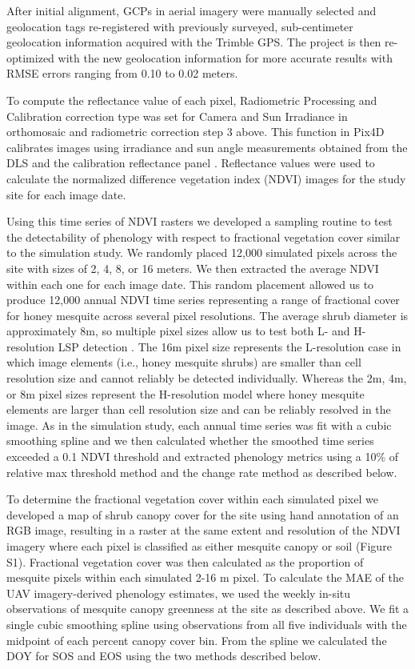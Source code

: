 \documentclass{article}
\begin{document}
After initial alignment, GCPs in aerial imagery were manually selected and geolocation tags re-registered with previously surveyed, sub-centimeter geolocation information acquired with the Trimble GPS. The project is then re-optimized with the new geolocation information for more accurate results with RMSE errors ranging from 0.10 to 0.02 meters.

To compute the reflectance value of each pixel, Radiometric Processing and Calibration correction type was set for Camera and Sun Irradiance in orthomosaic and radiometric correction step 3 above. This function in Pix4D calibrates images using irradiance and sun angle measurements obtained from the DLS and the calibration reflectance panel \cite{cao2019}. Reflectance values were used to calculate the normalized difference vegetation index (NDVI) images for the study site for each image date. 

Using this time series of NDVI rasters we developed a sampling routine to test the detectability of phenology with respect to fractional vegetation cover similar to the simulation study. We randomly placed 12,000 simulated pixels across the site with sizes of 2, 4, 8, or 16 meters. We then extracted the average NDVI within each one for each image date. This random placement allowed us to produce 12,000 annual NDVI time series representing a range of fractional cover for honey mesquite across several pixel resolutions. The average shrub diameter is approximately 8m, so multiple pixel sizes allow us to test both L- and H-resolution LSP detection \cite{strahler1986}. The 16m pixel size represents the L-resolution case in which image elements (i.e., honey mesquite shrubs) are smaller than cell resolution size and cannot reliably be detected individually. Whereas the 2m, 4m, or 8m pixel sizes represent the H-resolution model where honey mesquite elements are larger than cell resolution size and can be reliably resolved in the image. As in the simulation study, each annual time series was fit with a cubic smoothing spline and we then calculated whether the smoothed time series exceeded a 0.1 NDVI threshold and extracted phenology metrics using a 10\% of relative max threshold method and the change rate method as described below. 

To determine the fractional vegetation cover within each simulated pixel we developed a map of shrub canopy cover for the site using hand annotation of an RGB image, resulting in a raster at the same extent and resolution of the NDVI imagery where each pixel is classified as either mesquite canopy or soil (Figure S1). Fractional vegetation cover was then calculated as the proportion of mesquite pixels within each simulated 2-16 m pixel. To calculate the MAE of the UAV imagery-derived phenology estimates, we used the weekly in-situ observations of mesquite canopy greenness at the site as described above. We fit a single cubic smoothing spline using observations from all five individuals with the midpoint of each percent canopy cover bin. From the spline we calculated the DOY for SOS and EOS using the two methods described below. 
\end{document}
